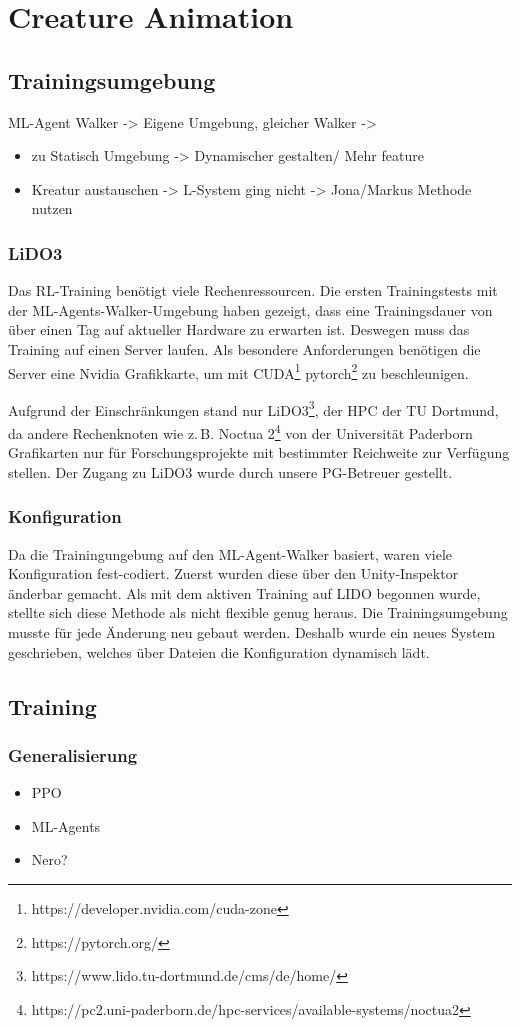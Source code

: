 \section{Creature Animation}

\subsection{Trainingsumgebung}
ML-Agent Walker -> Eigene Umgebung, gleicher Walker -> 
\begin{itemize}
	\item zu Statisch  Umgebung -> Dynamischer gestalten/ Mehr feature
	\item Kreatur austauschen -> L-System ging nicht -> Jona/Markus Methode nutzen
\end{itemize}

\subsubsection{LiDO3}
Das RL-Training benötigt viele Rechenressourcen. Die ersten Trainingstests mit der ML-Agents-Walker-Umgebung haben gezeigt, dass eine Trainingsdauer von über einen Tag auf aktueller Hardware zu erwarten ist. Deswegen muss das Training auf einen Server laufen. Als besondere Anforderungen benötigen die Server eine Nvidia Grafikkarte, um mit CUDA\footnote{https://developer.nvidia.com/cuda-zone} pytorch\footnote{https://pytorch.org/} zu beschleunigen.

Aufgrund der Einschränkungen stand nur LiDO3\footnote{https://www.lido.tu-dortmund.de/cms/de/home/}, der HPC der TU Dortmund, da andere Rechenknoten wie z.\,B. Noctua 2\footnote{https://pc2.uni-paderborn.de/hpc-services/available-systems/noctua2} von der Universität Paderborn Grafikarten nur für Forschungsprojekte mit bestimmter Reichweite zur Verfügung stellen. Der Zugang zu LiDO3 wurde durch unsere PG-Betreuer gestellt.
\subsubsection{Konfiguration}
Da die Trainingungebung auf den ML-Agent-Walker basiert, waren viele Konfiguration fest-codiert. Zuerst wurden diese über den Unity-Inspektor änderbar gemacht. Als mit dem aktiven Training auf LIDO begonnen wurde, stellte sich diese Methode als nicht flexible genug heraus. Die Trainingsumgebung musste für jede Änderung neu gebaut werden. Deshalb wurde ein neues System geschrieben, welches über Dateien die Konfiguration dynamisch lädt.

\subsection{Training}
\subsubsection{Generalisierung}
\begin{itemize}
	\item PPO
	\item ML-Agents
	\item Nero?
\end{itemize}
